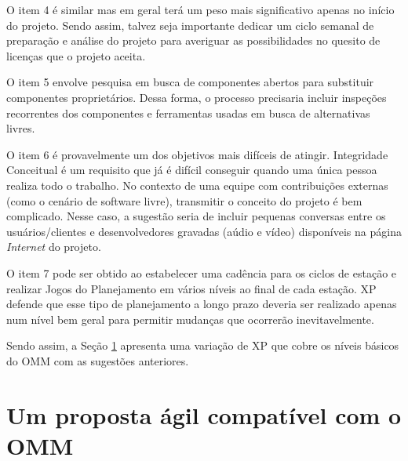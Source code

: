 O item 4 é similar mas em geral terá um peso mais significativo apenas
no início do projeto. Sendo assim, talvez seja importante dedicar um
ciclo semanal de preparação e análise do projeto para averiguar as
possibilidades no quesito de licenças que o projeto aceita.

O item 5 envolve pesquisa em busca de componentes abertos para
substituir componentes proprietários. Dessa forma, o processo
precisaria incluir inspeções recorrentes dos componentes e ferramentas
usadas em busca de alternativas livres.

O item 6 é provavelmente um dos objetivos mais difíceis de
atingir. Integridade Conceitual é um requisito que já é difícil
conseguir quando uma única pessoa realiza todo o trabalho. No contexto
de uma equipe com contribuições externas (como o cenário de software
livre), transmitir o conceito do projeto é bem complicado. Nesse caso,
a sugestão seria de incluir pequenas conversas entre os
usuários/clientes e desenvolvedores gravadas (aúdio e vídeo)
disponíveis na página \textit{Internet} do projeto.

O item 7 pode ser obtido ao estabelecer uma cadência para os ciclos de
estação e realizar Jogos do Planejamento em vários níveis ao final de
cada estação. XP defende que esse tipo de planejamento a longo prazo
deveria ser realizado apenas num nível bem geral para permitir
mudanças que ocorrerão inevitavelmente.

Sendo assim, a Seção \ref{sec:openagile-em-omm} apresenta uma variação
de XP que cobre os níveis básicos do OMM com as sugestões anteriores.

\section{Um proposta ágil compatível com o OMM}
\label{sec:openagile-em-omm}


